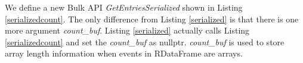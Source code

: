 We define a new Bulk API \textit{GetEntriesSerialized} shown in Listing \ref{serializedcount}. The only difference from Listing \ref{serialized} is that there is one more argument \textit{count\_buf}. Listing \ref{serialized} actually calls Listing \ref{serializedcount} and set the \textit{count\_buf} as nullptr. \textit{count\_buf} is used to store array length information when events in RDataFrame are arrays.
